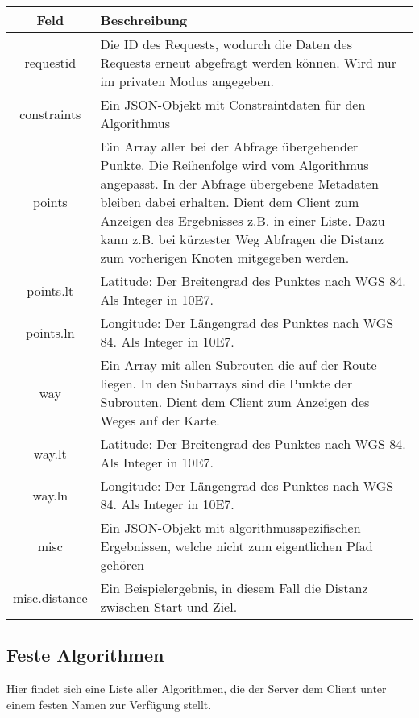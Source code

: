 \documentclass[ngerman,titlepage,parskip=true]{scrartcl}
\begin{document}
		\begin{tabular}{|c|p{12cm}|}
			\hline
			\textbf{Feld} & \textbf{Beschreibung} \\ 
			\hline \hline

			requestid & Die ID des Requests, wodurch die Daten des Requests erneut abgefragt werden können. Wird nur im privaten Modus angegeben.\\
			\hline
			
			constraints & Ein JSON-Objekt mit Constraintdaten für den Algorithmus\\
			\hline
			
			points & Ein Array aller bei der Abfrage übergebender Punkte. Die Reihenfolge wird vom Algorithmus angepasst. In der Abfrage übergebene Metadaten bleiben dabei erhalten. Dient dem Client zum Anzeigen des Ergebnisses z.B. in einer Liste. Dazu kann z.B. bei kürzester Weg Abfragen die Distanz zum vorherigen Knoten mitgegeben werden.\\
			\hline
			
	    	points.lt & Latitude: Der Breitengrad des Punktes nach WGS 84. Als Integer in 10E7.\\ 
	    	\hline
	    	
	    	points.ln & Longitude: Der Längengrad des Punktes nach WGS 84. Als Integer in 10E7.\\
	    	\hline
	    	
	    	way & Ein Array mit allen Subrouten die auf der Route liegen. In den Subarrays sind die Punkte der Subrouten. Dient dem Client zum Anzeigen des Weges auf der Karte.\\
			\hline
			
	    	way.lt & Latitude: Der Breitengrad des Punktes nach WGS 84. Als Integer in 10E7.\\ 
	    	\hline
	    	
	    	way.ln & Longitude: Der Längengrad des Punktes nach WGS 84. Als Integer in 10E7.\\
	    	\hline
	    	
	    	misc & Ein JSON-Objekt mit algorithmusspezifischen Ergebnissen, welche nicht zum eigentlichen Pfad gehören \\
	    	\hline
	    	
	    	misc.distance & Ein Beispielergebnis, in diesem Fall die Distanz zwischen Start und Ziel.\\
	    	\hline
		\end{tabular}


\subsection{Feste Algorithmen} 
Hier findet sich eine Liste aller Algorithmen, die der Server dem Client unter einem festen Namen zur Verfügung stellt.
\end{document}
